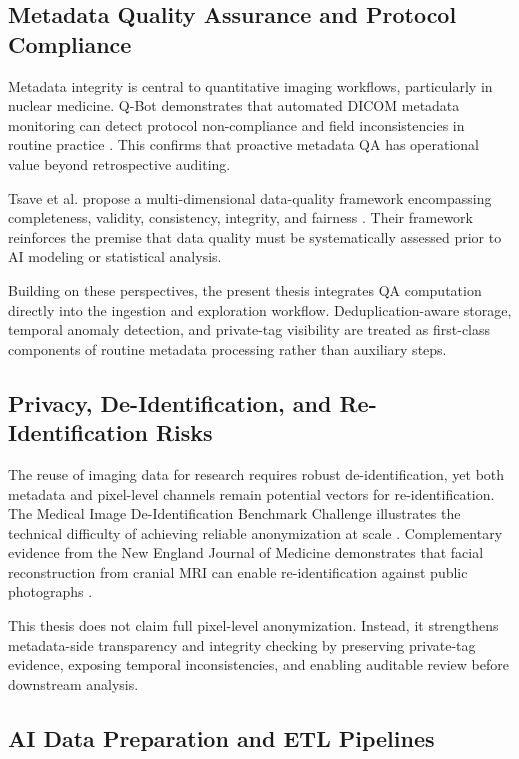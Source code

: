 \subsection{Metadata Quality Assurance and Protocol Compliance}

Metadata integrity is central to quantitative imaging workflows, particularly in nuclear medicine. Q-Bot demonstrates that automated DICOM metadata monitoring can detect protocol non-compliance and field inconsistencies in routine practice \cite{nagy_qbot}. This confirms that proactive metadata QA has operational value beyond retrospective auditing.

Tsave et al. propose a multi-dimensional data-quality framework encompassing completeness, validity, consistency, integrity, and fairness \cite{cancers17193213}. Their framework reinforces the premise that data quality must be systematically assessed prior to AI modeling or statistical analysis.

Building on these perspectives, the present thesis integrates QA computation directly into the ingestion and exploration workflow. Deduplication-aware storage, temporal anomaly detection, and private-tag visibility are treated as first-class components of routine metadata processing rather than auxiliary steps.

\subsection{Privacy, De-Identification, and Re-Identification Risks}

The reuse of imaging data for research requires robust de-identification, yet both metadata and pixel-level channels remain potential vectors for re-identification. The Medical Image De-Identification Benchmark Challenge illustrates the technical difficulty of achieving reliable anonymization at scale \cite{pei2025medicalimagedeidentificationbenchmark}. Complementary evidence from the New England Journal of Medicine demonstrates that facial reconstruction from cranial MRI can enable re-identification against public photographs \cite{anonrisk}.

This thesis does not claim full pixel-level anonymization. Instead, it strengthens metadata-side transparency and integrity checking by preserving private-tag evidence, exposing temporal inconsistencies, and enabling auditable review before downstream analysis.

\subsection{AI Data Preparation and ETL Pipelines}

